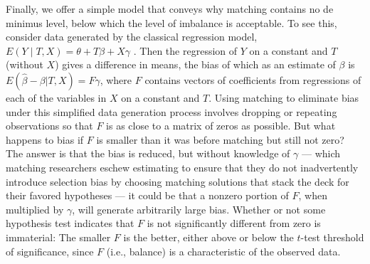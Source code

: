 \documentclass[11pt,titlepage]{article}
\begin{document}
Finally, we offer a simple model that conveys why matching contains no
de minimus level, below which the level of imbalance is acceptable.
To see this, consider data generated by the classical regression
model, $E(Y\mid T,X)= \theta + T\beta + X\gamma$ \citep{Goldberger91}.
Then the regression of $Y$ on a constant and $T$ (without $X$) gives a
difference in means, the bias of which as an estimate of $\beta$ is
$E(\hat\beta-\beta|T,X) = F\gamma$, where $F$ contains vectors of
coefficients from regressions of each of the variables in $X$ on a
constant and $T$.  Using matching to eliminate bias under this
simplified data generation process involves dropping or repeating
observations so that $F$ is as close to a matrix of zeros as possible.
But what happens to bias if $F$ is smaller than it was before matching
but still not zero?  The answer is that the bias is reduced, but
without knowledge of $\gamma$ --- which matching researchers eschew
estimating to ensure that they do not inadvertently introduce
selection bias by choosing matching solutions that stack the deck for
their favored hypotheses --- it could be that a nonzero portion of
$F$, when multiplied by $\gamma$, will generate arbitrarily large
bias.  Whether or not some hypothesis test indicates that $F$ is not
significantly different from zero is immaterial: The smaller $F$ is
the better, either above or below the $t$-test threshold of
significance, since $F$ (i.e., balance) is a characteristic of the
observed data.
\end{document}

